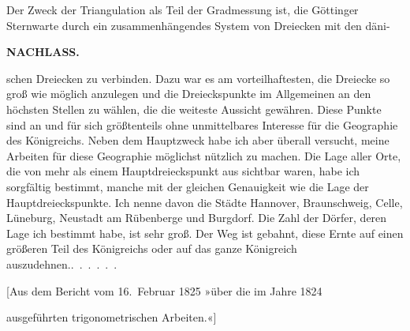 Der Zweck der Triangulation als Teil der Gradmessung ist, die Göttinger
Sternwarte durch ein zusammenhängendes System von Dreiecken mit den \mbox{däni-}
\par\smallskip\noindent\hfill\makebox[0.18\linewidth][l]{52\textsuperscript{*}}\par
\clearpage
\noindent{}\hfill{\small\textbf{NACHLASS.}}\hfill\null\par\medskip
\noindent schen Dreiecken zu verbinden. Dazu war es am vorteilhaftesten, die Dreiecke
so groß wie möglich anzulegen und die Dreieckspunkte im Allgemeinen an den
höchsten Stellen zu wählen, die die weiteste Aussicht gewähren. Diese Punkte
sind an und für sich größtenteils ohne unmittelbares Interesse für die
Geographie des Königreichs. Neben dem Hauptzweck habe ich aber überall
versucht, meine Arbeiten für diese Geographie möglichst nützlich zu machen.
Die Lage aller Orte, die von mehr als einem Hauptdreieckspunkt aus sichtbar
waren, habe ich sorgfältig bestimmt, manche mit der gleichen Genauigkeit wie
die Lage der Hauptdreieckspunkte. Ich nenne davon die Städte Hannover,
Braunschweig, Celle, Lüneburg, Neustadt am Rübenberge und Burgdorf. Die Zahl
der Dörfer, deren Lage ich bestimmt habe, ist sehr groß. Der Weg ist gebahnt,
diese Ernte auf einen größeren Teil des Königreichs oder auf das ganze
Königreich auszudehnen.\quad\mbox{.\ .\ .\ .\ .\ .}

\bigskip
\begin{center}
[Aus dem Bericht vom 16.~Februar 1825 »über die im Jahre 1824\par
ausgeführten trigonometrischen Arbeiten.«]
\end{center}

